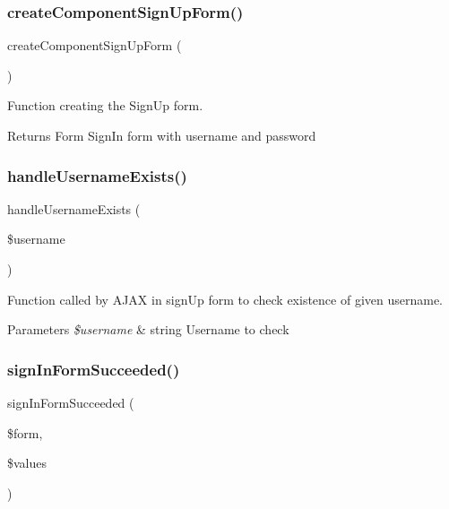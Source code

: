 \subsubsection{\texorpdfstring{create\+Component\+Sign\+Up\+Form()}{createComponentSignUpForm()}}
{\footnotesize\ttfamily create\+Component\+Sign\+Up\+Form (\begin{DoxyParamCaption}{ }\end{DoxyParamCaption})}

Function creating the Sign\+Up form.

\begin{DoxyReturn}{Returns}
Form Sign\+In form with username and password 
\end{DoxyReturn}
\mbox{\label{class_app_1_1_presenters_1_1_sign_presenter_aab0bff536238b6c628a58419d1d94d5d}} 
\subsubsection{\texorpdfstring{handle\+Username\+Exists()}{handleUsernameExists()}}
{\footnotesize\ttfamily handle\+Username\+Exists (\begin{DoxyParamCaption}\item[{}]{\$username }\end{DoxyParamCaption})}

Function called by A\+J\+AX in sign\+Up form to check existence of given username.


\begin{DoxyParams}{Parameters}
{\em \$username} & string Username to check \\
\hline
\end{DoxyParams}
\mbox{\label{class_app_1_1_presenters_1_1_sign_presenter_ab125eb8fde8a0bb557f930e1bbf348d3}} 
\subsubsection{\texorpdfstring{sign\+In\+Form\+Succeeded()}{signInFormSucceeded()}}
{\footnotesize\ttfamily sign\+In\+Form\+Succeeded (\begin{DoxyParamCaption}\item[{}]{\$form,  }\item[{}]{\$values }\end{DoxyParamCaption})}

